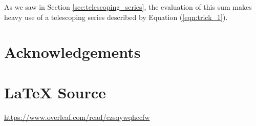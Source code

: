 \documentclass{article}
\theoremstyle{definition}
\begin{document}
\bigskip
\noindent
As we saw in Section \ref{sec:telescoping_series}, the evaluation
of this sum makes heavy use of a telescoping series described by
Equation (\ref{eqn:trick_1}).
%
%
%
\section*{Acknowledgements}
%
%
\section*{\LaTeX \hspace{0.10 mm} Source}
\url{https://www.overleaf.com/read/czsqywqhccfw}
%
%
%


%
%
\end{document}
